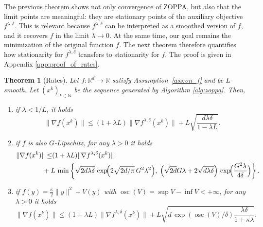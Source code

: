 \documentclass{article}
\newtheorem{theorem}{Theorem}
\newcommand{\R}{\mathbb{R}}
\begin{document}
The previous theorem shows not only convergence of ZOPPA, but also that the limit points are meaningful: they are stationary points of the auxiliary objective \(f^{\lambda,\delta}\). This is relevant because \(f^{\lambda,\delta}\) can be interpreted as a smoothed version of \(f\), and it recovers \(f\) in the limit \(\lambda\to 0\). At the same time, our goal remains the minimization of the original function \(f\). The next theorem therefore quantifies how stationarity for \(f^{\lambda,\delta}\) transfers to stationarity for \(f\). The proof is given in Appendix \ref{app:proof_of_rates}.



\begin{theorem}[Rates]\label{thm:rates}
    Let $f:\R^d\to \R$ satisfy Assumption~\ref{ass:on_f} and be $L$-smooth. Let  $(x^k)_{k\in\mathbb{N}}$ be the sequence generated by Algorithm \ref{alg:zoppa}. Then, 
    \begin{enumerate}
        \item[(i)] if $\lambda < 1/L$, it holds
        \[\|\nabla f(x^k)\| \leq (1+\lambda L)\| \nabla f^{\lambda,\delta}(x^k)\| + L \sqrt{\frac{d \lambda \delta}{1-\lambda L}}.\]
        \item[(ii)] if $f$ is also $G$-Lipschitz, for any $\lambda >0$ it holds
\[\begin{aligned}\|\nabla f(x^k)\| \leq & (1+\lambda L)\| \nabla f^{\lambda,\delta}(x^k)\| \\
& \hspace{-0.5cm} + L\,
\min\left\{
\sqrt{2d \lambda\delta}\,
\exp\!\Bigl(2\sqrt{2d/\pi}\,G^2\lambda^2\Bigr),\;
\left(\sqrt{2 d}G\lambda+2\sqrt{d\lambda\delta}\right)\,
\exp\!\Bigl(\frac{G^2\lambda}{4\delta}\Bigr)
\right\}.
\end{aligned}\]
\item[(iii)] if $f(y)=\frac{\kappa}{2}\|y\|^2+V(y)$ with $\operatorname{osc}(V)= \sup V - \inf V <+\infty$, for any $\lambda>0$ it holds
\[
\|\nabla f(x^k)\|
\le
(1+\lambda L)\|\nabla f^{\lambda,\delta}(x^k)\|
+
L\sqrt{
d\,\exp{(\operatorname{osc}(V)/\delta)}
\frac{\lambda\delta}{1+\kappa\lambda}
}.
\]
    \end{enumerate}
\end{theorem}
\end{document}
